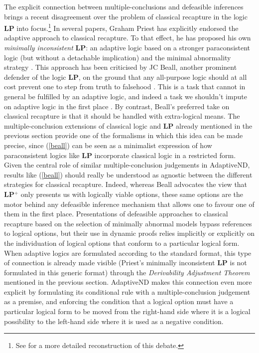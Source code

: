 \documentclass[]{article}
\begin{document}
The explicit connection between multiple-conclusions and defeasible inferences brings a recent disagreement over the problem of classical recapture in the logic \textbf{LP} into focus.\footnote{See \cite[18ff]{Allo:Theoria:2015} for a more detailed reconstruction of this debate.} In several papers, Graham Priest has explicitly endorsed the adaptive approach to classical recapture. To that effect, he has proposed his own \emph{minimally inconsistent} \textbf{LP}: an adaptive logic based on a stronger paraconsistent logic (but without a detachable implication) and the minimal abnormality strategy \cite{GP:LPm}. This approach has been criticised by JC Beall, another prominent defender of the logic \textbf{LP}, on the ground that any all-purpose logic should at all cost prevent one to step from truth to falsehood \cite{Beall01072012}. This is a task that cannot in general be fulfilled by an adaptive logic, and indeed a task we shouldn't impute on adaptive logic in the first place \cite{Priest01102012}. By contrast, Beall's preferred take on classical recapture is that it should be handled with extra-logical means. The multiple-conclusion extensions of classical logic and \textbf{LP} already mentioned in the previous section provide one of the formalisms in which this idea can be made precise, since (\ref{beall}) can be seen as a minimalist expression of how paraconsistent logics like \textbf{LP} incorporate classical logic in a restricted form. Given the central role of similar multiple-conclusion judgements in \textsf{AdaptiveND}, results like (\ref{beall}) should really be understood as agnostic between the different strategies for classical recapture. Indeed, whereas Beall advocates the view that \textbf{LP$^+$} only presents us with logically viable options, these same options are the motor behind any defeasible inference mechanism that allows one to favour one of them in the first place. Presentations of defeasible approaches to classical recapture based on the selection of minimally abnormal models bypass references to logical options, but their use in dynamic proofs relies implicitly or explicitly on the individuation of logical options that conform to a particular logical form. When adaptive logics are formulated according to the standard format, this type of connection is already made visible (Priest's minimally inconsistent \textbf{LP} is not formulated in this generic format) through the \emph{Derivability Adjustment Theorem} mentioned in the previous section. \textsf{AdaptiveND} makes this connection even more explicit by formulating its conditional rule with a multiple-conclusion judgement as a premise, and enforcing the condition that a logical option must have a particular logical form to be moved from the right-hand side where it is a logical possibility to the left-hand side where it is used as a negative condition.
\end{document}

